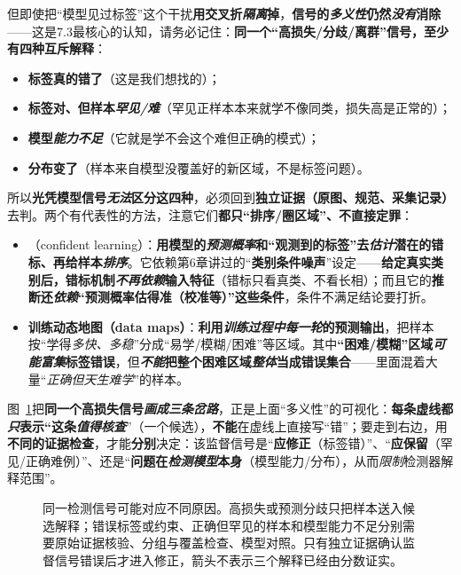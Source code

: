 \Needspace{95mm}
但即使把“模型见过标签”这个干扰\textbf{用交叉折\emph{隔离}掉}，\textbf{信号的\emph{多义性}仍然\emph{没有}消除}——这是7.3最核心的认知，请务必记住：\textbf{同一个“高损失/分歧/离群”信号，至少有四种互斥解释}：
\begin{itemize}\item \textbf{标签真的错了}（这是我们想找的）；\item \textbf{标签对、但样本\emph{罕见/难}}（罕见正样本本来就学不像同类，损失高是正常的）；\item \textbf{模型\emph{能力不足}}（它就是学不会这个难但正确的模式）；\item \textbf{分布变了}（样本来自模型没覆盖好的新区域，不是标签问题）。\end{itemize}
所以\textbf{光凭模型信号\emph{无法}区分这四种}，必须回到\textbf{独立证据（原图、规范、采集记录）}去判。两个有代表性的方法，注意它们\textbf{都只“排序/圈区域”、不直接定罪}：
\begin{itemize}\item {}（confident learning）：\textbf{用模型的\emph{预测概率}和“观测到的标签”去\emph{估计}潜在的错标、再给样本\emph{排序}}。它依赖第6章讲过的“\textbf{类别条件噪声}”设定——\textbf{给定真实类别后，错标机制\emph{不再依赖}输入特征}（错标只看真类、不看长相）；而且它的\textbf{推断还\emph{依赖}“预测概率估得准（校准等）”这些条件}，条件不满足结论要打折。\item \textbf{训练动态地图（data maps）}：\textbf{利用\emph{训练过程中每一轮}的预测输出}，把样本按“学得\emph{多快、多稳}”分成“易学/模糊/困难”等区域。其中\textbf{“困难/模糊”区域\emph{可能富集}标签错误}，但\textbf{\emph{不能}把整个困难区域\emph{整体}当成错误集合}——里面混着大量“\emph{正确但天生难学}”的样本。\end{itemize}

图~\ref{fig:knowledge-quality-assessment-correction-detection-signal}把\textbf{同一个高损失信号\emph{画成三条岔路}}，正是上面“多义性”的可视化：\textbf{每条虚线都\emph{只}表示“这条\emph{值得核查}}”（一个候选），\textbf{不能}在虚线上直接写“错”；要走到右边，用\textbf{不同的证据检查}，才能\textbf{分别}决定：该监督信号是“\textbf{应修正}（标签错）”、“\textbf{应保留}（罕见/正确难例）”、还是“\textbf{问题在\emph{检测模型}本身}（模型能力/分布），从而\emph{限制}检测器解释范围”。

\begin{figure}[p]
  \centering
  
  \caption{同一检测信号可能对应不同原因。高损失或预测分歧只把样本送入候选解释；错误标签或约束、正确但罕见的样本和模型能力不足分别需要原始证据核验、分组与覆盖检查、模型对照。只有独立证据确认监督信号错误后才进入修正，箭头不表示三个解释已经由分数证实。}
  \label{fig:knowledge-quality-assessment-correction-detection-signal}
\end{figure}
\FloatBarrier

